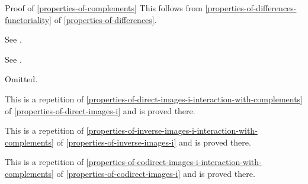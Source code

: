 \begin{Proof}{Proof of \cref{properties-of-complements}}%
    This follows from \cref{properties-of-differences-functoriality} of \cref{properties-of-differences}.

    See \cite{proof-wiki:de-morgan-s-laws-set-theory}.

    See \cite{proof-wiki:complement-of-complement}.

    Omitted.

    This is a repetition of \cref{properties-of-direct-images-i-interaction-with-complements} of \cref{properties-of-direct-images-i} and is proved there.

    This is a repetition of \cref{properties-of-inverse-images-i-interaction-with-complements} of \cref{properties-of-inverse-images-i} and is proved there.

    This is a repetition of \cref{properties-of-codirect-images-i-interaction-with-complements} of \cref{properties-of-codirect-images-i} and is proved there.
\end{Proof}
